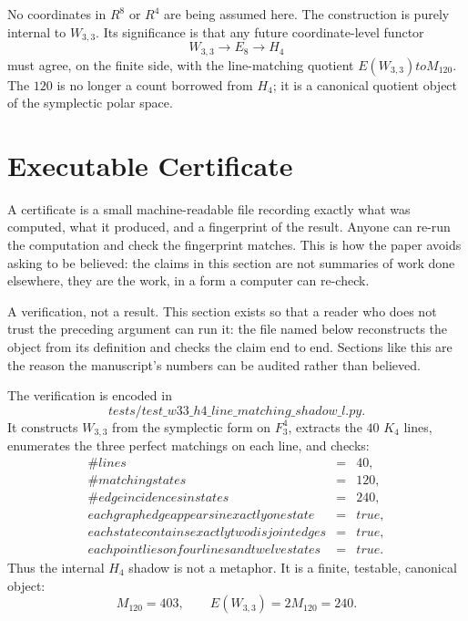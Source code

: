 \documentclass[12pt,a4paper]{article}
\def\mathbb#1{#1}%
\def\mathcal#1{#1}%
\def\texttt#1{#1}%
\def\text#1{#1}%
\def\cdot{ }%
\def\to{ to }%
\theoremstyle{definition}
\newcommand{\FF}{\mathbb{F}}
\newcommand{\RR}{\mathbb{R}}
\begin{document}
No coordinates in $\RR^8$ or $\RR^4$ are being assumed here.  The
construction is purely internal to $W_{3,3}$.  Its significance is that
any future coordinate-level functor
\[
W_{3,3}\longrightarrow E_8\longrightarrow H_4
\]
must agree, on the finite side, with the line-matching quotient
$E(W_{3,3})\to\mathcal{M}_{120}$.  The $120$ is no longer a count
borrowed from $H_4$; it is a canonical quotient object of the symplectic
polar space.

\section*{Executable Certificate}

\begin{plainbox}
A certificate is a small machine-readable file recording exactly what was computed,
what it produced, and a fingerprint of the result. Anyone can re-run the computation and
check the fingerprint matches. This is how the paper avoids asking to be believed: the
claims in this section are not summaries of work done elsewhere, they are the work, in a
form a computer can re-check.
\end{plainbox}


\begin{plainbox}
A verification, not a result. This section exists so that a reader who does not
trust the preceding argument can run it: the file named below reconstructs the object from
its definition and checks the claim end to end. Sections like this are the reason the
manuscript's numbers can be audited rather than believed.
\end{plainbox}


The verification is encoded in
\[
\texttt{tests/test\_w33\_h4\_line\_matching\_shadow\_l.py}.
\]
It constructs $W_{3,3}$ from the symplectic form on $\FF_3^4$, extracts
the $40$ $K_4$ lines, enumerates the three perfect matchings on each
line, and checks:
\[
\begin{array}{rcl}
\#\text{lines} &=& 40,\\
\#\text{matching states} &=& 120,\\
\#\text{edge incidences in states} &=& 240,\\
\text{each graph edge appears in exactly one state} &=& \text{true},\\
\text{each state contains exactly two disjoint edges} &=& \text{true},\\
\text{each point lies on four lines and twelve states} &=& \text{true}.
\end{array}
\]
Thus the internal $H_4$ shadow is not a metaphor. It is a finite,
testable, canonical object:
\[
\boxed{\;\mathcal{M}_{120}=40\cdot 3,\qquad
E(W_{3,3})=2\mathcal{M}_{120}=240.\;}
\]
\end{document}
